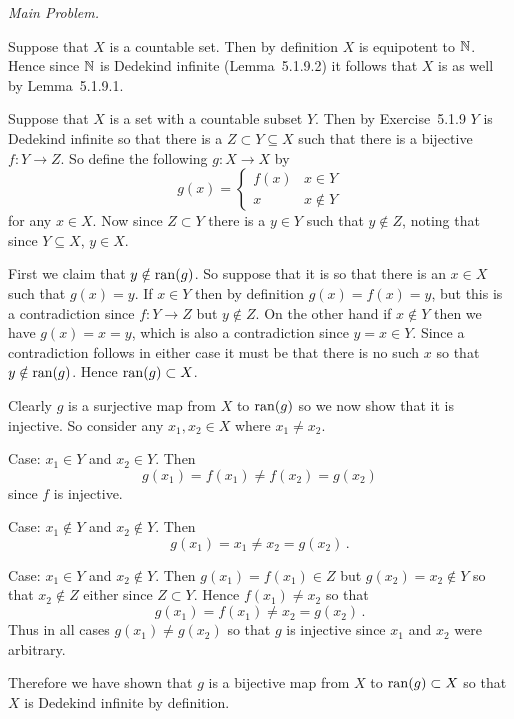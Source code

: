 \begin{solution}
    \emph{Main Problem.}
    
	Suppose that $X$ is a countable set.
    Then by definition $X$ is equipotent to $\mathbb{N}$.
    Hence since $\mathbb{N}$ is Dedekind infinite (Lemma~5.1.9.2) it follows that $X$ is as well by Lemma~5.1.9.1.
\end{solution}


\begin{solution}
	Suppose that $X$ is a set with a countable subset $Y$.
    Then by Exercise~5.1.9 $Y$ is Dedekind infinite so that there is a $Z \subset Y \subseteq X$ such that there is a bijective $f : Y \to Z$.
    So define the following $g: X \to X$ by
    $$
    g(x) = \begin{cases}
    	f(x) & x \in Y \\
        x & x \notin Y
    \end{cases}
    $$
    for any $x \in X$.
    Now since $Z \subset Y$ there is a $y \in Y$ such that $y \notin Z$, noting that since $Y \subseteq X$, $y \in X$.

    First we claim that $y \notin \mathrm{ran}(g)$.
    So suppose that it is so that there is an $x \in X$ such that $g(x) = y$.
    If $x \in Y$ then by definition $g(x) = f(x) = y$, but this is a contradiction since $f : Y \to Z$ but $y \notin Z$.
    On the other hand if $x \notin Y$ then we have $g(x) = x = y$, which is also a contradiction since $y = x \in Y$.
    Since a contradiction follows in either case it must be that there is no such $x$ so that $y \notin \mathrm{ran}(g)$.
    Hence $\mathrm{ran}(g) \subset X$.

    Clearly $g$ is a surjective map from $X$ to $\mathrm{ran}(g)$ so we now show that it is injective.
    So consider any $x_1, x_2 \in X$ where $x_1 \neq x_2$.

    Case: $x_1 \in Y$ and $x_2 \in Y$.
    Then
    $$
    g(x_1) = f(x_1) \neq f(x_2) = g(x_2)
    $$
    since $f$ is injective.

    Case: $x_1 \notin Y$ and $x_2 \notin Y$.
    Then
    $$
    g(x_1) = x_1 \neq x_2 = g(x_2) \,.
    $$

    Case: $x_1 \in Y$ and $x_2 \notin Y$.
    Then $g(x_1) = f(x_1) \in Z$ but $g(x_2) = x_2 \notin Y$ so that  $x_2 \notin Z$ either since $Z \subset Y$.
    Hence $f(x_1) \neq x_2$ so that
    $$
    g(x_1) = f(x_1) \neq x_2 = g(x_2) \,.
    $$
    Thus in all cases $g(x_1) \neq g(x_2)$ so that $g$ is injective since $x_1$ and $x_2$ were arbitrary.

    Therefore we have shown that $g$ is a bijective map from $X$ to $\mathrm{ran}(g) \subset X$ so that $X$ is Dedekind infinite by definition.
\end{solution}

